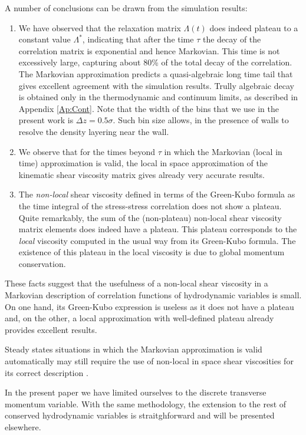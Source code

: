 \documentclass[a4paper,openright,12pt]{book}
\begin{document}
A number of conclusions can be drawn from the simulation results:
\begin{enumerate}
\item We  have observed that  the relaxation matrix  $\Lambda(t)$ does
  indeed  plateau to  a  constant value  $\Lambda^*$, indicating  that
  after  the  time $\tau$  the  decay  of  the correlation  matrix  is
  exponential  and  hence Markovian.   This  time  is not  excessively
  large, capturing about  80\% of the total decay  of the correlation.
  The  Markovian approximation  predicts a  quasi-algebraic long  time
  tail  that gives  excellent agreement  with the  simulation results.
  Trully algebraic  decay is  obtained only  in the  thermodynamic and
  continuum limits, as described  in Appendix \ref{Ap:Cont}. Note that
  the width  of the bins  that we use in  the present work  is $\Delta
  z=0.5\sigma$.  Such bin  size allows,  in the  presence of  walls to
  resolve the density layering near the wall.
\item  We observe  that  for  the times  beyond  $\tau$  in which  the
  Markovian (local in time) approximation is valid, the local in space
  approximation of the kinematic  shear viscosity matrix gives already
  very accurate results.
\item The \textit{non-local}  shear viscosity defined in  terms of the
  Green-Kubo  formula  as  the  time  integral  of  the  stress-stress
  correlation does  not show a  plateau. Quite remarkably, the  sum of
  the  (non-plateau) non-local  shear viscosity  matrix elements  does
  indeed   have  a   plateau.    This  plateau   corresponds  to   the
  \textit{local}  viscosity  computed  in   the  usual  way  from  its
  Green-Kubo  formula. The  existence  of this  plateau  in the  local
  viscosity is due to global momentum conservation.
\end{enumerate}
These facts suggest that the usefulness of a non-local shear viscosity
in a  Markovian description  of correlation functions  of hydrodynamic
variables is small.  On one hand, its Green-Kubo expression is useless
as it does not have a plateau and, on the other, a local approximation
with well-defined plateau already provides excellent results.

Steady states situations in which the Markovian approximation is valid
automatically may  still require the  use of non-local in  space shear
viscosities for its correct description \cite{.}.

In  the  present paper  we  have  limited  ourselves to  the  discrete
transverse  momentum   variable.   With  the  same   methodology,  the
extension  to   the  rest  of  conserved   hydrodynamic  variables  is
straitghforward and will be presented elsewhere. 
\end{document}
